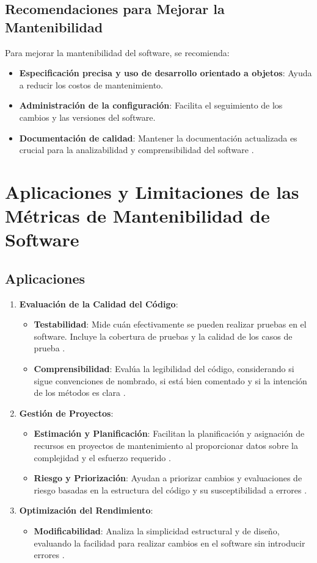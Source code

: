 \documentclass{article}
\begin{document}
\subsection{Recomendaciones para Mejorar la Mantenibilidad}
Para mejorar la mantenibilidad del software, se recomienda:
\begin{itemize}
    \item \textbf{Especificación precisa y uso de desarrollo orientado a objetos}: Ayuda a reducir los costos de mantenimiento.
    \item \textbf{Administración de la configuración}: Facilita el seguimiento de los cambios y las versiones del software.
    \item \textbf{Documentación de calidad}: Mantener la documentación actualizada es crucial para la analizabilidad y comprensibilidad del software \cite{ingeniare2020}.
\end{itemize}

\section{Aplicaciones y Limitaciones de las Métricas de Mantenibilidad de Software}
\subsection{Aplicaciones}
\begin{enumerate}
    \item \textbf{Evaluación de la Calidad del Código}:
    \begin{itemize}
        \item \textbf{Testabilidad}: Mide cuán efectivamente se pueden realizar pruebas en el software. Incluye la cobertura de pruebas y la calidad de los casos de prueba \cite{QuandaryPeak}.
        \item \textbf{Comprensibilidad}: Evalúa la legibilidad del código, considerando si sigue convenciones de nombrado, si está bien comentado y si la intención de los métodos es clara \cite{QuandaryPeak}.
    \end{itemize}
    \item \textbf{Gestión de Proyectos}:
    \begin{itemize}
        \item \textbf{Estimación y Planificación}: Facilitan la planificación y asignación de recursos en proyectos de mantenimiento al proporcionar datos sobre la complejidad y el esfuerzo requerido .
        \item \textbf{Riesgo y Priorización}: Ayudan a priorizar cambios y evaluaciones de riesgo basadas en la estructura del código y su susceptibilidad a errores .
    \end{itemize}
    \item \textbf{Optimización del Rendimiento}:
    \begin{itemize}
        \item \textbf{Modificabilidad}: Analiza la simplicidad estructural y de diseño, evaluando la facilidad para realizar cambios en el software sin introducir errores \cite{QuandaryPeak}.
    \end{itemize}
\end{enumerate}
\end{document}
